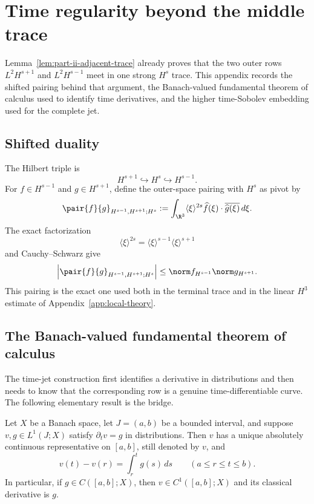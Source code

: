\section{Time regularity beyond the middle trace}
\label{app:time-traces}

Lemma~\ref{lem:part-ii-adjacent-trace} already proves that the two outer rows
\(L^2H^{s+1}\) and \(L^2H^{s-1}\) meet in one strong \(H^s\) trace.  This
appendix records the shifted pairing behind that argument, the
Banach-valued fundamental theorem of calculus used to identify time
derivatives, and the higher time-Sobolev embedding used for the complete jet.

\subsection{Shifted duality}

The Hilbert triple is
\[
 H^{s+1}\hookrightarrow H^s\hookrightarrow H^{s-1}.
\]
For \(f\in H^{s-1}\) and \(g\in H^{s+1}\), define the outer-space pairing with \(H^s\) as pivot by
\[
 \pair{f}{g}_{H^{s-1},H^{s+1};H^s}
 :=\int_{\R^3}\langle\xi\rangle^{2s}
 \widehat f(\xi)\cdot\overline{\widehat g(\xi)}\,d\xi.
\]
The exact factorization
\[
 \langle\xi\rangle^{2s}
 =\langle\xi\rangle^{s-1}\langle\xi\rangle^{s+1}
\]
and Cauchy--Schwarz give
\begin{equation}
 \left|\pair{f}{g}_{H^{s-1},H^{s+1};H^s}\right|
 \le\norm f_{H^{s-1}}\norm g_{H^{s+1}}.
 \label{eq:appendix-shifted-duality-bound}
\end{equation}
This pairing is the exact one used both in the terminal trace and in the linear \(H^3\) estimate of Appendix~\ref{app:local-theory}.

\subsection{The Banach-valued fundamental theorem of calculus}

The time-jet construction first identifies a derivative in distributions and then needs to know that the corresponding row is a genuine time-differentiable curve.
The following elementary result is the bridge.

\begin{lemma}
\label{lem:banach-fundamental-calculus}
Let \(X\) be a Banach space, let \(J=(a,b)\) be a bounded interval, and suppose \(v,g\in L^1(J;X)\) satisfy \(\partial_tv=g\) in distributions.
Then \(v\) has a unique absolutely continuous representative on \([a,b]\), still denoted by \(v\), and
\begin{equation}
 v(t)-v(r)=\int_r^tg(s)\,ds
 \qquad(a\le r\le t\le b).
 \label{eq:appendix-banach-ftc}
\end{equation}
In particular, if \(g\in C([a,b];X)\), then \(v\in C^1([a,b];X)\) and its classical derivative is \(g\).
\end{lemma}


